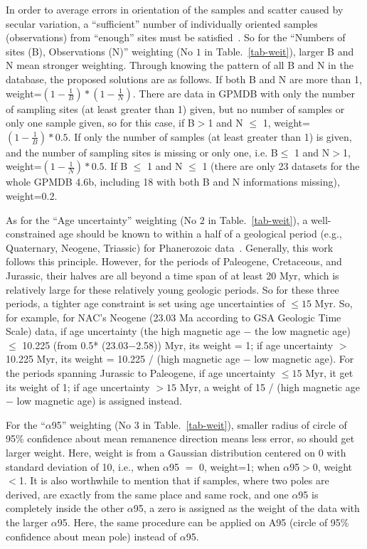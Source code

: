 In order to average errors in orientation of the samples and scatter caused by
secular variation, a ``sufficient'' number of individually oriented samples
(observations) from ``enough'' sites must be satisfied~\cite{T18,v90,B02}. So
for the ``Numbers of sites (B), Observations (N)'' weighting (No $1$ in
Table.~\ref{tab-weit}), larger B and N mean stronger weighting. Through knowing
the pattern of all B and N in the database, the proposed solutions are as
follows. If both B and N are more than 1, weight=$(1- \frac{1}{B})*(1-
\frac{1}{N})$. There are data in GPMDB with only the number of sampling sites
(at least greater than 1) given, but no number of samples or only one sample
given, so for this case, if B$>$1 and N $\leq$ 1, weight=$(1- \frac{1}{B})*0.5$.
If only the number of samples (at least greater than 1) is given, and the
number of sampling sites is missing or only one, i.e. B$\leq$ 1 and N$>$1,
weight=$(1- \frac{1}{N})*0.5$. If B $\leq$ 1 and N $\leq$ 1 (there are only 23
datasets for the whole GPMDB 4.6b, including 18 with both B and N informations
missing), weight=0.2.

As for the ``Age uncertainty'' weighting (No $2$ in Table.~\ref{tab-weit}), a
well-constrained age should be known to within a half of a geological period
(e.g., Quaternary, Neogene, Triassic) for Phanerozoic data~\cite{v90,T18}.
Generally, this work follows this principle. However, for the periods of
Paleogene, Cretaceous, and Jurassic, their halves are all beyond a time span of
at least 20 Myr, which is relatively large for these relatively young geologic
periods. So for these three periods, a tighter age constraint is set using age
uncertainties of $\leq15$ Myr. So, for example, for NAC's Neogene
(23.03 Ma according to GSA Geologic Time Scale) data, if age
uncertainty (the high magnetic age $-$ the low magnetic age) $\leq$ 10.225 (from
0.5* (23.03$-$2.58)) Myr, its weight = 1; if age uncertainty $>$ 10.225 Myr, its
weight = 10.225 / (high magnetic age $-$ low magnetic age). For the periods
spanning Jurassic to Paleogene, if age uncertainty $\leq15$ Myr, it get its
weight of 1; if age uncertainty $>15$ Myr, a weight of 15 / (high magnetic age
$-$ low magnetic age) is assigned instead.

For the ``$\alpha$95'' weighting (No $3$ in Table.~\ref{tab-weit}), smaller
radius of circle of 95\% confidence about mean remanence direction means less
error, so should get larger weight. Here, weight is from a Gaussian distribution
centered on 0 with standard deviation of 10, i.e., when $\alpha$95 $=$ 0,
weight=1; when $\alpha$95$>$0, weight$<$1. It is also worthwhile to mention that
if samples, where two poles are derived, are exactly from the same place and
same rock, and one $\alpha$95 is completely inside the other $\alpha$95, a zero
is assigned as the weight of the data with the larger $\alpha$95. Here, the same
procedure can be applied on A95 (circle of 95\% confidence about mean pole)
instead of $\alpha$95.

